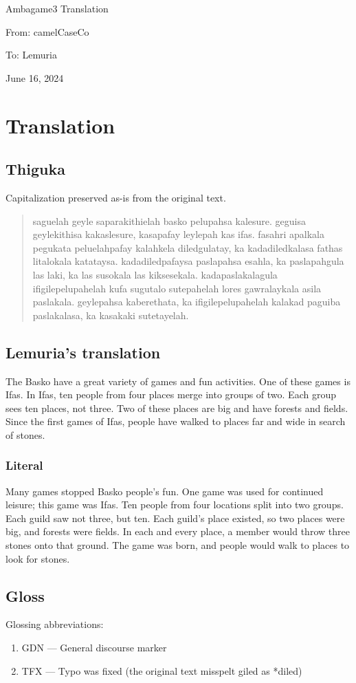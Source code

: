 \documentclass{thiguka}
\begin{document}
Ambagame3 Translation

From: camelCaseCo

To: Lemuria

June 16, 2024

\section{Translation}
\subsection{Thiguka}
Capitalization preserved as-is from the original text.

\begin{quotation}
saguelah geyle saparakithielah basko pelupahsa kalesure.
geguisa geylekithisa kakaslesure, kasapafay leylepah kas ifas.
fasahri apalkala pegukata peluelahpafay kalahkela diledgulatay, ka kadadiledkalasa fathas litalokala katataysa.
kadadiledpafaysa paslapahsa esahla, ka paslapahgula las laki, ka las susokala las kiksesekala.
kadapaslakalagula ifigilepelupahelah kufa sugutalo sutepahelah lores gawralaykala asila paslakala.
geylepahsa kaberethata, ka ifigilepelupahelah kalakad paguiba paslakalasa, ka kasakaki sutetayelah.
\end{quotation}


\subsection{Lemuria's translation}
The Basko have a great variety of games and fun activities. One of these games is Ifas.
In Ifas, ten people from four places merge into groups of two.
Each group sees ten places, not three.
Two of these places are big and have forests and fields.
Since the first games of Ifas, people have walked to places far and wide in search of stones.

\subsubsection{Literal}
Many games stopped Basko people's fun.
One game was used for continued leisure; this game was Ifas.
Ten people from four locations split into two groups.
Each guild saw not three, but ten.
Each guild's place existed, so two places were big, and forests were fields.
In each and every place, a member would throw three stones onto that ground.
The game was born, and people would walk to places to look for stones.


\subsection{Gloss}
Glossing abbreviations:
\begin{enumerate}
    \item GDN --- General discourse marker
    \item TFX --- Typo was fixed (the original text misspelt giled as *diled)
\end{enumerate}
\end{document}
